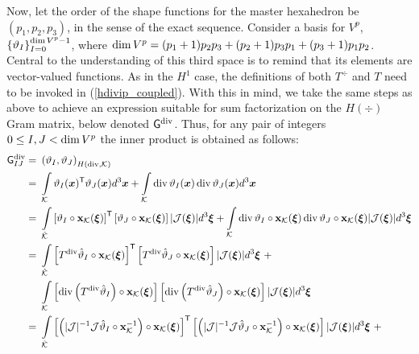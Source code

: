 Now, let the order of the shape functions for the master hexahedron be $(p_1,p_2,p_3)$, in the sense of the exact sequence. Consider a basis for $V^p$, $\left\{ \vartheta_I \right\}_{I=0}^{\operatorname*{dim} V^p-1}$, where $\operatorname*{dim} V^p=(p_1+1)p_2p_3+(p_2+1)p_3p_1+(p_3+1)p_1p_2$. Central to the understanding of this third space is to remind that its elements are vector-valued functions. As in the $H^1$ case, the definitions of both $T^{\div}$ and $T$ need to be invoked in (\ref{hdivip_coupled}). With this in mind, we take the same steps as above to achieve an expression suitable for sum factorization on the $H(\div)$ Gram matrix, below denoted $\mathsf{G}^{\operatorname{div}}$. Thus, for any pair of integers $0\leq I,J<\operatorname*{dim} V^p$ the inner product is obtained as follows:
% 
\begin{align}
                          \sfG^{\div}_{IJ}  =\ &\left(\vartheta_I,\vartheta_J\right)_{\HSo(\div,\mcK)} \nonumber\\
                                        \ =\ & \int\limits_{\mcK}\vartheta_I(\bsx)^\T\vartheta_J(\bsx)d^3\bsx + \int\limits_{\mcK}\div\vartheta_I(\bsx)\div\vartheta_J(\bsx)d^3\bsx \nonumber\\ 
                                        \ =\ & \int\limits_{\hatK}\left[\vartheta_I\circ\bfx_\mcK(\bsxi)\right]^\T\left[\vartheta_J\circ\bfx_\mcK(\bsxi)\right]|\mcJ(\bsxi)|d^3\bsxi +
                                        \int\limits_{\mcK}\div\vartheta_I\circ\bfx_\mcK(\bsxi)\div\vartheta_J\circ\bfx_\mcK(\bsxi)|\mcJ(\bsxi)|d^3\bsxi \nonumber\\ 
                                        \ =\ & \int\limits_{\hatK}
                                        \left[T^{\div}\hat{\vartheta}_I\circ\bfx_\mcK(\bsxi)\right]^\T\left[T^{\div}\hat{\vartheta}_J\circ\bfx_\mcK(\bsxi)\right]|\mcJ(\bsxi)|d^3\bsxi \ +\nonumber\\*
                                        \ & \int\limits_{\mcK}
                                        \left[\div\left(T^{\div}\hat{\vartheta}_I\right)\circ\bfx_\mcK(\bsxi)\right]\left[\div \left(T^{\div}\hat{\vartheta}_J\right)\circ\bfx_\mcK(\bsxi)\right]|\mcJ(\bsxi)|d^3\bsxi \nonumber\\ 
                                        =\ & \int\limits_{\hatK}
                                        \left[\left(|\mcJ|^{-1}\mcJ\hat{\vartheta}_I\circ\bfx_\mcK^{-1}\right)\circ\bfx_\mcK(\bsxi)\right]^\T\left[\left(|\mcJ|^{-1}\mcJ\hat{\vartheta}_J\circ\bfx_\mcK^{-1}\right)\circ\bfx_\mcK(\bsxi)\right]|\mcJ(\bsxi)|d^3\bsxi \ +\nonumber\\*

\end{align}

